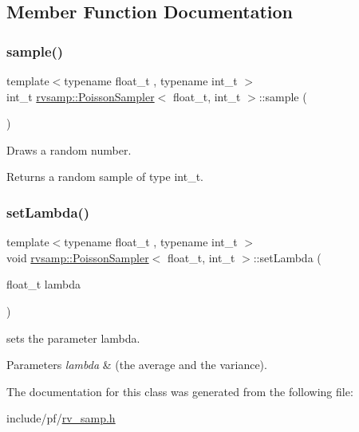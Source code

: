\subsection{Member Function Documentation}
\mbox{\label{classrvsamp_1_1PoissonSampler_ad03710cfc36a888768bbcc7f05da4458}} 
\subsubsection{\texorpdfstring{sample()}{sample()}}
{\footnotesize\ttfamily template$<$typename float\+\_\+t , typename int\+\_\+t $>$ \\
int\+\_\+t \hyperlink{classrvsamp_1_1PoissonSampler}{rvsamp\+::\+Poisson\+Sampler}$<$ float\+\_\+t, int\+\_\+t $>$\+::sample (\begin{DoxyParamCaption}{ }\end{DoxyParamCaption})}



Draws a random number. 

\begin{DoxyReturn}{Returns}
a random sample of type int\+\_\+t. 
\end{DoxyReturn}
\mbox{\label{classrvsamp_1_1PoissonSampler_ad376dabecbb8ae862e71e45958009e4d}} 
\subsubsection{\texorpdfstring{set\+Lambda()}{setLambda()}}
{\footnotesize\ttfamily template$<$typename float\+\_\+t , typename int\+\_\+t $>$ \\
void \hyperlink{classrvsamp_1_1PoissonSampler}{rvsamp\+::\+Poisson\+Sampler}$<$ float\+\_\+t, int\+\_\+t $>$\+::set\+Lambda (\begin{DoxyParamCaption}\item[{float\+\_\+t}]{lambda }\end{DoxyParamCaption})}



sets the parameter lambda. 


\begin{DoxyParams}{Parameters}
{\em lambda} & (the average and the variance). \\
\hline
\end{DoxyParams}


The documentation for this class was generated from the following file\+:\begin{DoxyCompactItemize}
\item 
include/pf/\hyperlink{rv__samp_8h}{rv\+\_\+samp.\+h}\end{DoxyCompactItemize}
